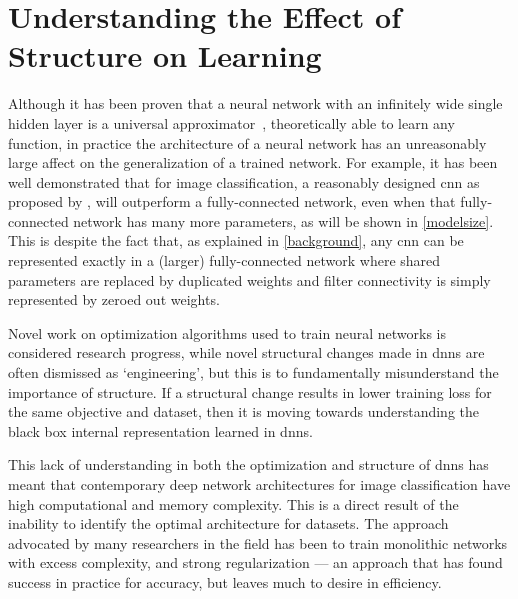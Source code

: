 \documentclass[thesis]{subfiles}
\begin{document}
\section[Understanding the Effect of Structure on Learning]{Understanding the Effect of\texorpdfstring{\\}{ }Structure on Learning}
Although it has been proven that a neural network with an infinitely wide single hidden layer is a universal approximator~\citep{journals/mcss/Cybenko92,hornik89a},  theoretically able to learn any function, in practice the architecture of a neural network has an unreasonably large affect on the generalization of a trained network. For example, it has been well demonstrated that for image classification, a reasonably designed \gls{cnn} as proposed by \citet{Lecun1998}, will outperform a fully-connected network, even when that fully-connected network has many more parameters, as will be shown in \cref{modelsize}. This is despite the fact that, as explained in \cref{background}, any \gls{cnn} can be represented exactly in a (larger) fully-connected network where shared parameters are replaced by duplicated weights and filter connectivity is simply represented by zeroed out weights.

Novel work on optimization algorithms used to train neural networks is considered research progress, while novel structural changes made in \glspl{dnn} are often dismissed as `engineering', but this is to fundamentally misunderstand the importance of structure. If a structural change results in lower training loss for the same objective and dataset, then it is moving towards understanding the black box internal representation learned in \glspl{dnn}. %

This lack of understanding in both the optimization and structure of \glspl{dnn} has meant that contemporary deep network architectures for image classification have high computational and memory complexity. This is a direct result of the inability to identify the optimal architecture for datasets. The approach advocated by many researchers in the field has been to train monolithic networks with excess complexity, and strong regularization --- an approach that has found success in practice for accuracy, but leaves much to desire in efficiency.
\end{document}
